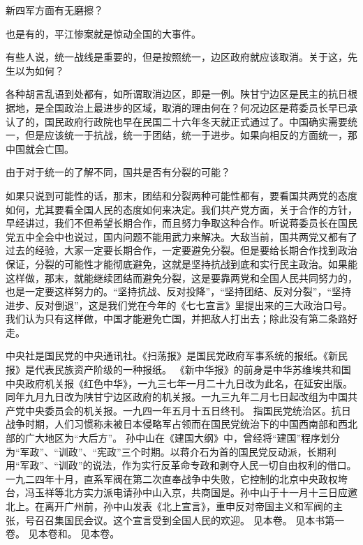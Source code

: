 新四军方面有无磨擦？

也是有的，平江惨案就是惊动全国的大事件。

有些人说，统一战线是重要的，但是按照统一，边区政府就应该取消。关于这，先生以为如何？

各种胡言乱语到处都有，如所谓取消边区，即是一例。陕甘宁边区是民主的抗日根据地，是全国政治上最进步的区域，取消的理由何在？何况边区是蒋委员长早已承认了的，国民政府行政院也早在民国二十六年冬天就正式通过了。中国确实需要统一，但是应该统一于抗战，统一于团结，统一于进步。如果向相反的方面统一，那中国就会亡国。

由于对于统一的了解不同，国共是否有分裂的可能？

如果只说到可能性的话，那末，团结和分裂两种可能性都有，要看国共两党的态度如何，尤其要看全国人民的态度如何来决定。我们共产党方面，关于合作的方针，早经讲过，我们不但希望长期合作，而且努力争取这种合作。听说蒋委员长在国民党五中全会中也说过，国内问题不能用武力来解决。大敌当前，国共两党又都有了过去的经验，大家一定要长期合作，一定要避免分裂。但是要给长期合作找到政治保证，分裂的可能性才能彻底避免，这就是坚持抗战到底和实行民主政治。如果能这样做，那末，就能继续团结而避免分裂，这是要靠两党和全国人民共同努力的，也是一定要这样努力的。“坚持抗战、反对投降”，“坚持团结、反对分裂”，“坚持进步、反对倒退”，这是我们党在今年的《七七宣言》里提出来的三大政治口号。我们认为只有这样做，中国才能避免亡国，并把敌人打出去；除此没有第二条路好走。


\begin{maonote}
中央社是国民党的中央通讯社。《扫荡报》是国民党政府军事系统的报纸。《新民报》是代表民族资产阶级的一种报纸。
《新中华报》的前身是中华苏维埃共和国中央政府机关报《红色中华》，一九三七年一月二十九日改为此名，在延安出版。同年九月九日改为陕甘宁边区政府的机关报。一九三九年二月七日起改组为中国共产党中央委员会的机关报。一九四一年五月十五日终刊。
指国民党统治区。抗日战争时期，人们习惯称未被日本侵略军占领而在国民党统治下的中国西南部和西北部的广大地区为“大后方”。
孙中山在《建国大纲》中，曾经将“建国”程序划分为“军政”、“训政”、“宪政”三个时期。以蒋介石为首的国民党反动派，长期利用“军政”、“训政”的说法，作为实行反革命专政和剥夺人民一切自由权利的借口。
一九二四年十月，直系军阀在第二次直奉战争中失败，它控制的北京中央政权垮台，冯玉祥等北方实力派电请孙中山入京，共商国是。孙中山于十一月十三日应邀北上。在离开广州前，孙中山发表《北上宣言》，重申反对帝国主义和军阀的主张，号召召集国民会议。这个宣言受到全国人民的欢迎。
见本卷。
见本书第一卷。
见本卷和。
见本卷。
\end{maonote}
